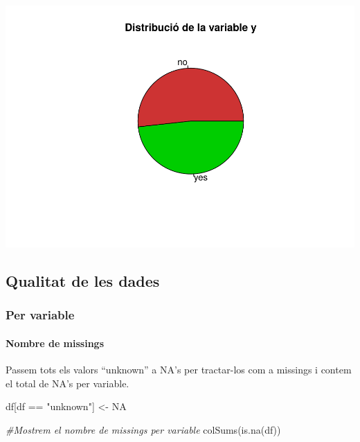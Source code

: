 \documentclass[
]{article}
\newenvironment{Shaded}{\begin{snugshade}}{\end{snugshade}}
\newcommand{\CommentTok}[1]{\textcolor[rgb]{0.56,0.35,0.01}{\textit{#1}}}
\newcommand{\ConstantTok}[1]{\textcolor[rgb]{0.00,0.00,0.00}{#1}}
\newcommand{\FunctionTok}[1]{\textcolor[rgb]{0.00,0.00,0.00}{#1}}
\newcommand{\NormalTok}[1]{#1}
\newcommand{\OtherTok}[1]{\textcolor[rgb]{0.56,0.35,0.01}{#1}}
\newcommand{\SpecialCharTok}[1]{\textcolor[rgb]{0.00,0.00,0.00}{#1}}
\newcommand{\StringTok}[1]{\textcolor[rgb]{0.31,0.60,0.02}{#1}}
\begin{document}
\includegraphics{Entrega-1_files/figure-latex/unnamed-chunk-30-1.pdf}

\hypertarget{qualitat-de-les-dades}{%
\subsection{Qualitat de les dades}\label{qualitat-de-les-dades}}

\hypertarget{per-variable}{%
\subsubsection{Per variable}\label{per-variable}}

\hypertarget{nombre-de-missings}{%
\paragraph{Nombre de missings}\label{nombre-de-missings}}

Passem tots els valors ``unknown'' a NA's per tractar-los com a missings
i contem el total de NA's per variable.

\begin{Shaded}
\begin{Highlighting}[]
\NormalTok{df[df }\SpecialCharTok{==} \StringTok{"unknown"}\NormalTok{] }\OtherTok{\textless{}{-}} \ConstantTok{NA}

\CommentTok{\#Mostrem el nombre de missings per variable}
\FunctionTok{colSums}\NormalTok{(}\FunctionTok{is.na}\NormalTok{(df))}
\end{Highlighting}
\end{Shaded}
\end{document}
